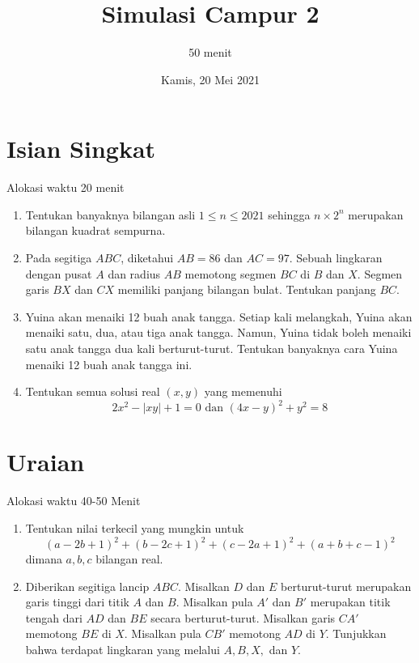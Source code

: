 \documentclass{article}
\title{Simulasi Campur 2}
\author{50 menit}
\date{Kamis, 20 Mei 2021}
\begin{document}
	\maketitle
	
	\section{Isian Singkat}
	Alokasi waktu 20 menit
	\begin{enumerate}
		\item Tentukan banyaknya bilangan asli $1 \le n \le 2021$ sehingga $n\times2^n$ merupakan bilangan kuadrat sempurna.
		
		\item Pada segitiga $ABC$, diketahui $AB=86$ dan $AC=97$. Sebuah lingkaran dengan pusat $A$ dan radius $AB$ memotong segmen $BC$ di $B$ dan $X$. Segmen garis $BX$ dan $CX$ memiliki panjang bilangan bulat. Tentukan panjang $BC$.
		
		\item Yuina akan menaiki 12 buah anak tangga. Setiap kali melangkah, Yuina akan menaiki satu, dua, atau tiga anak tangga. Namun, Yuina tidak boleh menaiki satu anak tangga dua kali berturut-turut. Tentukan banyaknya cara Yuina menaiki 12 buah anak tangga ini.
		
		
		
		\item Tentukan semua solusi real $(x,y)$ yang memenuhi $$2x^2-|xy|+1=0 \text{ dan } (4x-y)^2+y^2=8$$
		
	\end{enumerate}


\section{Uraian}
Alokasi waktu 40-50 Menit
\begin{enumerate}[resume]
		\item Tentukan nilai terkecil yang mungkin untuk $$(a-2b+1)^2+(b-2c+1)^2+(c-2a+1)^2+(a+b+c-1)^2$$ dimana $a,b,c$ bilangan real.
		
		\item Diberikan segitiga lancip $ABC$. Misalkan $D$ dan $E$ berturut-turut merupakan garis tinggi dari titik $A$ dan $B$. Misalkan pula $A'$ dan $B'$ merupakan titik tengah dari $AD$ dan $BE$ secara berturut-turut. Misalkan garis $CA'$ memotong $BE$ di $X$. Misalkan pula $CB'$ memotong $AD$ di $Y$. Tunjukkan bahwa terdapat lingkaran yang melalui $A,B,X,$ dan $Y$.
\end{enumerate}
\end{document}
